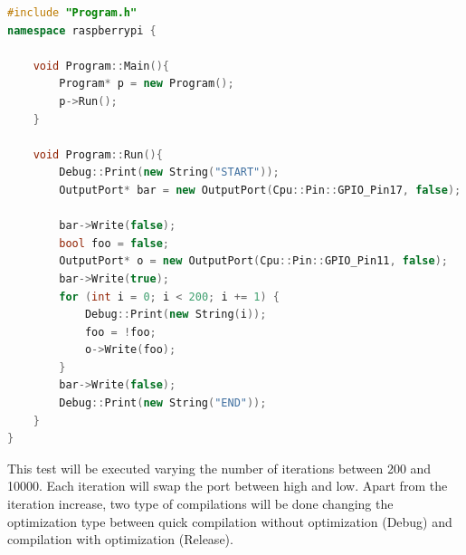 \begin{lstlisting}[language=C++, caption={GPIO Performance translated to C++}]
#include "Program.h"
namespace raspberrypi {

	void Program::Main(){
		Program* p = new Program();
		p->Run();
	}

	void Program::Run(){
		Debug::Print(new String("START"));
		OutputPort* bar = new OutputPort(Cpu::Pin::GPIO_Pin17, false);
	
		bar->Write(false);
		bool foo = false;
		OutputPort* o = new OutputPort(Cpu::Pin::GPIO_Pin11, false);
		bar->Write(true);
		for (int i = 0; i < 200; i += 1) {
			Debug::Print(new String(i));
			foo = !foo;
			o->Write(foo);
		}
		bar->Write(false);
		Debug::Print(new String("END"));
	}
}
\end{lstlisting}

This test will be executed varying the number of iterations between 200 and 10000. Each iteration will swap the port between high and low. Apart from the iteration increase, two type of compilations will be done changing the optimization type between quick compilation without optimization (Debug) and compilation with optimization (Release).

